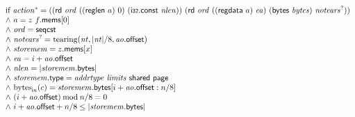 $$\begin{array}[t]{@{}lrcl@{}l@{}}
{\begin{array}[t]{@{}l@{}}
\mbox{if}~ {{\mathit{action}}^\ast} = ((\mathsf{rd}~{\mathit{ord}}~((\mathsf{reglen}~a)~0)~(\mathsf{i{\scriptstyle 32}}{.}\mathsf{const}~{\mathit{nlen}}))~(\mathsf{rd}~{\mathit{ord}}~((\mathsf{regdata}~a)~{\mathit{ea}})~(\mathsf{bytes}~{\mathit{bytes}})~{{\mathit{notears}}^?})) \\
{\land}~ a = z~f{.}\mathsf{mems}{}[0] \\
{\land}~ {\mathit{ord}} = \mathsf{seqcst} \\
{\land}~ {{\mathit{notears}}^?} = {\mathrm{tearing}}({\mathit{nt}}, {|{\mathit{nt}}|} / 8, {\mathit{ao}}{.}\mathsf{offset}) \\
{\land}~ {\mathit{storemem}} = z{.}\mathsf{mems}{}[x] \\
{\land}~ {\mathit{ea}} = i + {\mathit{ao}}{.}\mathsf{offset} \\
{\land}~ {\mathit{nlen}} = {|{\mathit{storemem}}{.}\mathsf{bytes}|} \\
{\land}~ {\mathit{storemem}}{.}\mathsf{type} = {\mathit{addrtype}}~{\mathit{limits}}~\mathsf{shared}~\mathsf{page} \\
{\land}~ {{\mathrm{bytes}}}_{{\mathsf{i}}{n}}(c) = {\mathit{storemem}}{.}\mathsf{bytes}{}[i + {\mathit{ao}}{.}\mathsf{offset} : n / 8] \\
{\land}~ (i + {\mathit{ao}}{.}\mathsf{offset}) \mathbin{\mathrm{mod}} n / 8 = 0 \\
{\land}~ i + {\mathit{ao}}{.}\mathsf{offset} + n / 8 \leq {|{\mathit{storemem}}{.}\mathsf{bytes}|} \\
\end{array}
} \\
\end{array}
$$

\vspace{1ex}

